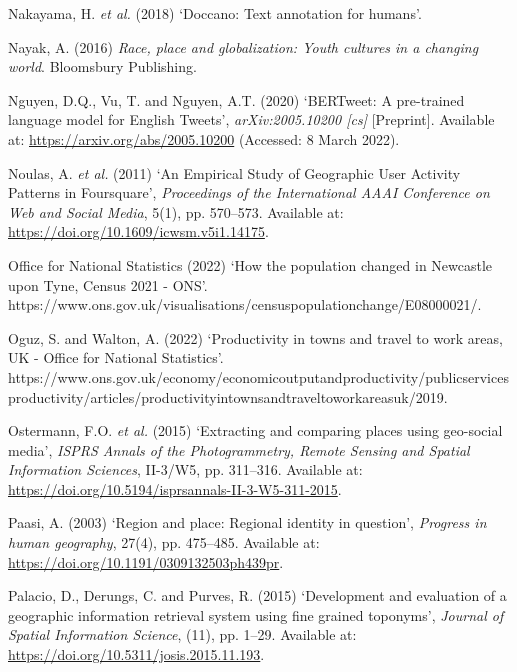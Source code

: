 \documentclass[
  letterpaper,
  11pt,
  english,
  onehalfspacing,
  headsepline]{MastersDoctoralThesis}
\newlength{\cslhangindent}
\newlength{\cslentryspacingunit} %
\newenvironment{CSLReferences}[2] %
 {%
  \setlength{\parindent}{0pt}
  \ifodd #1
  \let\oldpar\par
  \def\par{\hangindent=\cslhangindent\oldpar}
  \fi
  \setlength{\parskip}{#2\cslentryspacingunit}
 }%
 {}
\begin{document}
\begin{CSLReferences}{0}{0}
\leavevmode{}%
Nakayama, H. \emph{et al.} (2018) {`Doccano: Text annotation for
humans'}.

\leavevmode{}%
Nayak, A. (2016) \emph{Race, place and globalization: {Youth} cultures
in a changing world}. {Bloomsbury Publishing}.

\leavevmode{}%
Nguyen, D.Q., Vu, T. and Nguyen, A.T. (2020) {`{BERTweet}: {A}
pre-trained language model for {English Tweets}'},
\emph{arXiv:2005.10200 {[}cs{]}} {[}Preprint{]}. Available at:
\url{https://arxiv.org/abs/2005.10200} (Accessed: 8 March 2022).

\leavevmode{}%
Noulas, A. \emph{et al.} (2011) {`An {Empirical Study} of {Geographic
User Activity Patterns} in {Foursquare}'}, \emph{Proceedings of the
International AAAI Conference on Web and Social Media}, 5(1), pp.
570--573. Available at: \url{https://doi.org/10.1609/icwsm.v5i1.14175}.

\leavevmode{}%
Office for National Statistics (2022) {`How the population changed in
{Newcastle} upon {Tyne}, {Census} 2021 - {ONS}'}.
https://www.ons.gov.uk/visualisations/censuspopulationchange/E08000021/.

\leavevmode{}%
Oguz, S. and Walton, A. (2022) {`Productivity in towns and travel to
work areas, {UK} - {Office} for {National Statistics}'}.
https://www.ons.gov.uk/economy/economicoutputandproductivity/publicservicesproductivity/articles/productivityintownsandtraveltoworkareasuk/2019.

\leavevmode{}%
Ostermann, F.O. \emph{et al.} (2015) {`Extracting and comparing places
using geo-social media'}, \emph{ISPRS Annals of the Photogrammetry,
Remote Sensing and Spatial Information Sciences}, II-3/W5, pp. 311--316.
Available at:
\url{https://doi.org/10.5194/isprsannals-II-3-W5-311-2015}.

\leavevmode{}%
Paasi, A. (2003) {`Region and place: Regional identity in question'},
\emph{Progress in human geography}, 27(4), pp. 475--485. Available at:
\url{https://doi.org/10.1191/0309132503ph439pr}.

\leavevmode{}%
Palacio, D., Derungs, C. and Purves, R. (2015) {`Development and
evaluation of a geographic information retrieval system using fine
grained toponyms'}, \emph{Journal of Spatial Information Science}, (11),
pp. 1--29. Available at:
\url{https://doi.org/10.5311/josis.2015.11.193}.


\end{CSLReferences}
\end{document}
